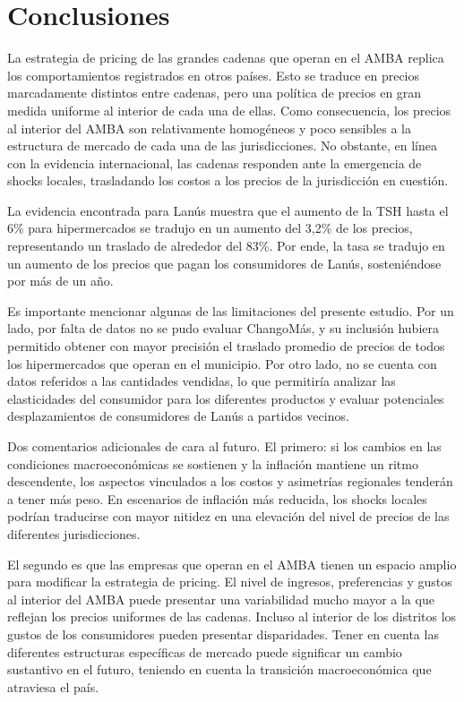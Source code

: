 \section{Conclusiones}

La estrategia de pricing de las grandes cadenas que operan en el AMBA replica los comportamientos registrados en otros países. Esto se traduce en precios marcadamente distintos entre cadenas, pero una política de precios en gran medida uniforme al interior de cada una de ellas. Como consecuencia, los precios al interior del AMBA son relativamente homogéneos y poco sensibles a la estructura de mercado de cada una de las jurisdicciones. No obstante, en línea con la evidencia internacional, las cadenas responden ante la emergencia de shocks locales, trasladando los costos a los precios de la jurisdicción en cuestión.

La evidencia encontrada para Lanús muestra que el aumento de la TSH hasta el 6\% para hipermercados se tradujo en un aumento del 3,2\% de los precios, representando un traslado de alrededor del 83\%. Por ende, la tasa se tradujo en un aumento de los precios que pagan los consumidores de Lanús, sosteniéndose por más de un año.

Es importante mencionar algunas de las limitaciones del presente estudio. Por un lado, por falta de datos no se pudo evaluar ChangoMás, y su inclusión hubiera permitido obtener con mayor precisión el traslado promedio de precios de todos los hipermercados que operan en el municipio. Por otro lado, no se cuenta con datos referidos a las cantidades vendidas, lo que permitiría analizar las elasticidades del consumidor para los diferentes productos y evaluar potenciales desplazamientos de consumidores de Lanús a partidos vecinos.

Dos comentarios adicionales de cara al futuro. El primero: si los cambios en las condiciones macroeconómicas se sostienen y la inflación mantiene un ritmo descendente, los aspectos vinculados a los costos y asimetrías regionales tenderán a tener más peso. En escenarios de inflación más reducida, los shocks locales podrían traducirse con mayor nitidez en una elevación del nivel de precios de las diferentes jurisdicciones.

El segundo es que las empresas que operan en el AMBA tienen un espacio amplio para modificar la estrategia de pricing. El nivel de ingresos, preferencias y gustos al interior del AMBA puede presentar una variabilidad mucho mayor a la que reflejan los precios uniformes de las cadenas. Incluso al interior de los distritos los gustos de los consumidores pueden presentar disparidades. Tener en cuenta las diferentes estructuras específicas de mercado puede significar un cambio sustantivo en el futuro, teniendo en cuenta la transición macroeconómica que atraviesa el país.

